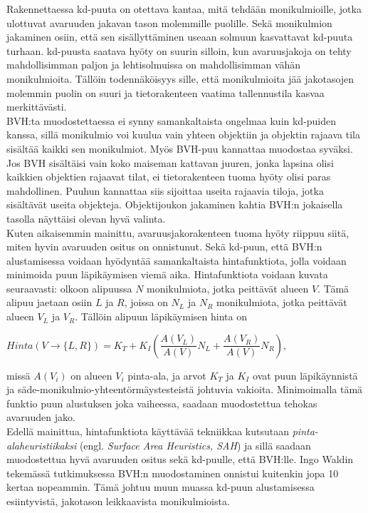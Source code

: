 ﻿\documentclass[a4paper, 12pt, titlepage]{article}
\begin{document}
Rakennettaessa kd-puuta on otettava kantaa, mitä tehdään monikulmioille, jotka ulottuvat avaruuden jakavan tason molemmille puolille. Sekä monikulmion jakaminen osiin, että sen sisällyttäminen useaan solmuun kasvattavat kd-puuta turhaan. kd-puusta saatava hyöty on suurin silloin, kun avaruusjakoja on tehty mahdollisimman paljon ja lehtisolmuissa on mahdollisimman vähän monikulmioita. Tällöin todennäköisyys sille, että monikulmioita jää jakotasojen molemmin puolin on suuri ja tietorakenteen vaatima tallennustila kasvaa merkittävästi. \citep[.]{wald04} \\

BVH:ta muodostettaessa ei synny samankaltaista ongelmaa kuin kd-puiden kanssa, sillä monikulmio voi kuulua vain yhteen objektiin ja objektin rajaava tila sisältää kaikki sen monikulmiot. Myös BVH-puu kannattaa muodostaa syväksi. Jos BVH sisältäisi vain koko maiseman kattavan juuren, jonka lapsina olisi kaikkien objektien rajaavat tilat, ei tietorakenteen tuoma hyöty olisi paras mahdollinen. Puuhun kannattaa siis sijoittaa useita rajaavia tiloja, jotka sisältävät useita objekteja. Objektijoukon jakaminen kahtia BVH:n jokaisella tasolla  näyttäisi olevan hyvä valinta. \citep[.]{goldsmith} \\

Kuten aikaisemmin mainittu, avaruusjakorakenteen tuoma hyöty riippuu siitä, miten hyvin avaruuden ositus on onnistunut. Sekä kd-puun, että BVH:n alustamisessa voidaan hyödyntää samankaltaista hintafunktiota, jolla voidaan minimoida puun läpikäymisen viemä aika. Hintafunktiota voidaan kuvata seuraavasti: olkoon alipuussa $N$ monikulmiota, jotka peittävät alueen $V$. Tämä alipuu jaetaan osiin $L$ ja $R$, joissa on $N_L$ ja $N_R$ monikulmiota, jotka peittävät alueen $V_L$ ja $V_R$. Tällöin alipuun läpikäymisen hinta on\\

\begin{centering} 
$Hinta(V\to\{L,R\}) = K_T + K_I(\dfrac{A(V_L)}{A(V)}N_L + \dfrac{A(V_R)}{A(V)}N_R)$,\\
\vspace{0.2cm}
\end{centering}
missä $A(V_i)$ on alueen $V_i$ pinta-ala, ja arvot $K_T$ ja $K_I$ ovat puun läpikäynnistä ja säde-monikulmio-yhteentörmäystesteistä johtuvia vakioita. Minimoimalla tämä funktio puun alustuksen joka vaiheessa, saadaan muodostettua tehokas avaruuden jako. \citep[.]{wald07}\\

Edellä mainittua, hintafunktiota käyttävää tekniikkaa kutsutaan \emph{pinta-alaheuristiikaksi} (engl. \emph{Surface Area Heuristics, SAH}) ja sillä saadaan muodostettua hyvä avaruuden ositus sekä kd-puulle, että BVH:lle. Ingo Waldin tekemässä tutkimuksessa BVH:n muodostaminen onnistui kuitenkin jopa 10 kertaa nopeammin. Tämä johtuu muun muassa kd-puun alustamisessa esiintyvistä, jakotason leikkaavista monikulmioista. \citep[.]{wald07}  
\end{document}
